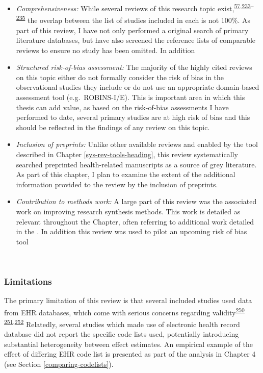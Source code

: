 \documentclass[a4paper, twoside]{templates/ociamthesis}
\providecommand{\tightlist}{%
  \setlength{\itemsep}{0pt}\setlength{\parskip}{0pt}}
\begin{document}
\begin{itemize}
\item
  \emph{Comprehensiveness:} While several reviews of this research topic exist,\textsuperscript{\protect\hyperlink{ref-chu2018}{57},\protect\hyperlink{ref-yang2020}{233}--\protect\hyperlink{ref-poly2020}{235}} the overlap between the list of studies included in each is not 100\%. As part of this review, I have not only performed a original search of primary literature databases, but have also screened the reference lists of comparable reviews to ensure no study has been omitted. In addition
\item
  \emph{Structured risk-of-bias assessment:} The majority of the highly cited reviews on this topic either do not formally consider the risk of bias in the observational studies they include or do not use an appropriate domain-based assessment tool (e.g.~ROBINS-I/E). This is important area in which this thesis can add value, as based on the risk-of-bias assessments I have performed to date, several primary studies are at high risk of bias and this should be reflected in the findings of any review on this topic.
\item
  \emph{Inclusion of preprints:} Unlike other available reviews and enabled by the tool described in Chapter \ref{sys-rev-tools-heading}, this review systematically searched preprinted health-related manuscripts as a source of grey literature. As part of this chapter, I plan to examine the extent of the additional information provided to the review by the inclusion of preprints.
\end{itemize}

\begin{itemize}
\tightlist
\item
  \emph{Contribution to methods work:} A large part of this review was the associated work on improving research synthesis methods. This work is detailed as relevant throughout the Chapter, often referring to additional work detailed in the . In addition this review was used to pilot an upcoming risk of bias tool
\end{itemize}

~

\hypertarget{limitations}{%
\subsubsection{Limitations}\label{limitations}}

The primary limitation of this review is that several included studies used data from EHR databases, which come with serious concerns regarding validity\textsuperscript{\protect\hyperlink{ref-hsieh2019}{250}} \textsuperscript{\protect\hyperlink{ref-mcguinness2019validity}{251},\protect\hyperlink{ref-wilkinson2018}{252}} Relatedly, several studies which made use of electronic health record database did not report the specific code lists used, potentially introducing substantial heterogeneity between effect estimates. An empirical example of the effect of differing EHR code list is presented as part of the analysis in Chapter 4 (see Section \ref{comparing-codelists}).
\end{document}
